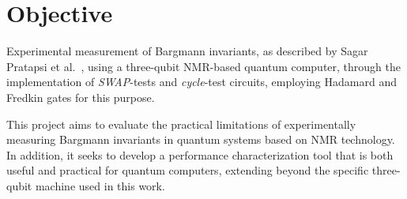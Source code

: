 \section{Objective}

Experimental measurement of Bargmann invariants, as described by Sagar Pratapsi et al.~\cite{Pratapsi2025elementary}, using a three-qubit NMR-based quantum computer, through the implementation of \emph{SWAP}-tests and \emph{cycle}-test circuits, employing Hadamard and Fredkin gates for this purpose.

This project aims to evaluate the practical limitations of experimentally measuring Bargmann invariants in quantum systems based on NMR technology. In addition, it seeks to develop a performance characterization tool that is both useful and practical for quantum computers, extending beyond the specific three-qubit machine used in this work.